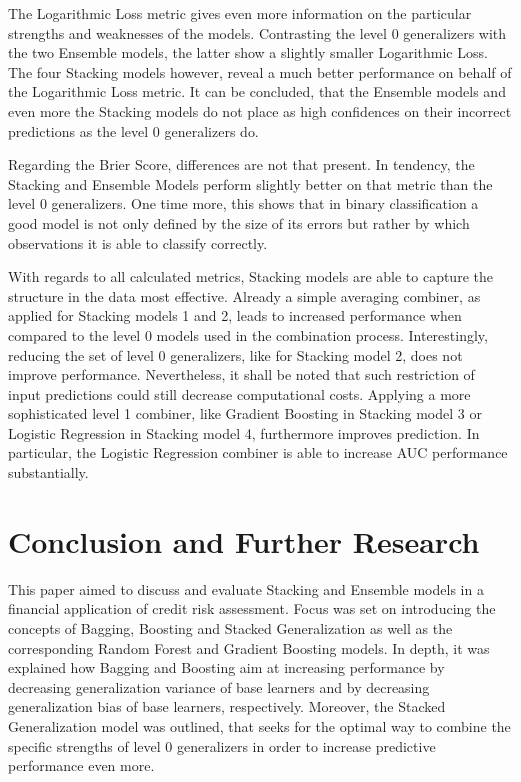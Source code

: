 \documentclass[12pt]{article}
\begin{document}
The Logarithmic Loss metric gives even more information on the particular strengths and weaknesses of the models. Contrasting the level 0 generalizers with the two Ensemble models, the latter show a slightly smaller Logarithmic Loss. The four Stacking models however, reveal a much better performance on behalf of the Logarithmic Loss metric. It can be concluded, that the Ensemble models and even more the Stacking models do not place as high confidences on their incorrect predictions as the level 0 generalizers do.

Regarding the Brier Score, differences are not that present. In tendency, the Stacking and Ensemble Models perform slightly better on that metric than the level 0 generalizers. One time more, this shows that in binary classification a good model is not only defined by the size of its errors but rather by which observations it is able to classify correctly.

With regards to all calculated metrics, Stacking models are able to capture the structure in the data most effective. Already a simple averaging combiner, as applied for Stacking models 1 and 2, leads to increased performance when compared to the level 0 models used in the combination process. Interestingly, reducing the set of level 0 generalizers, like for Stacking model 2, does not improve performance. Nevertheless, it shall be noted that such restriction of input predictions could still decrease computational costs. Applying a more sophisticated level 1 combiner, like Gradient Boosting in Stacking model 3 or Logistic Regression in Stacking model 4, furthermore improves prediction. In particular, the Logistic Regression combiner is able to increase AUC performance substantially. 



\section{Conclusion and Further Research}\label{conclusion}
This paper aimed to discuss and evaluate Stacking and Ensemble models in a financial application of credit risk assessment. Focus was set on introducing the concepts of Bagging, Boosting and Stacked Generalization as well as the corresponding Random Forest and Gradient Boosting models. In depth, it was explained how Bagging and Boosting aim at increasing performance by decreasing generalization variance of base learners and by decreasing generalization bias of base learners, respectively. Moreover, the Stacked Generalization model was outlined, that seeks for the optimal way to combine the specific strengths of level 0 generalizers in order to increase predictive performance even more.
\end{document}
